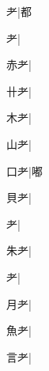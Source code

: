 \begin{multicols}{2}
{{\cjk{}{\cnsym{}　}{\cnsym{}　}耂}|{\cjk{}都}\par
{耂}|{}\par
{\cjk{}{\cnsym{}　}赤耂}|{}\par
{\cjk{}{\cnsym{}　}卄耂}|{}\par
{\cjk{}{\cnsym{}　}木耂}|{}\par
{\cjk{}{\cnsym{}　}山耂}|{}\par
{\cjk{}{\cnsym{}　}口耂}|{\cjk{}嘟}\par
{\cjk{}{\cnsym{}　}貝耂}|{}\par
{耂}|{}\par
{\cjk{}{\cnsym{}　}朱耂}|{}\par
{耂}|{}\par
{\cjk{}{\cnsym{}　}月耂}|{}\par
{\cjk{}{\cnsym{}　}魚耂}|{}\par
{\cjk{}{\cnsym{}　}言耂}|{}\par
}
\end{multicols}
